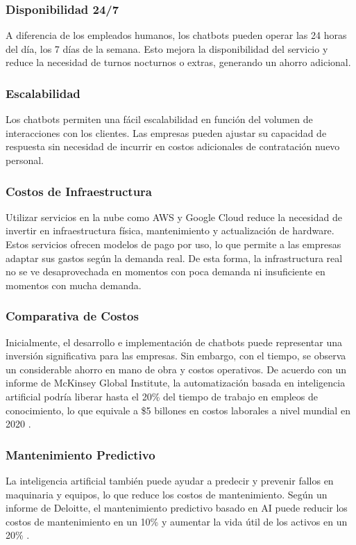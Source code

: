 \subsubsection{Disponibilidad 24/7}
A diferencia de los empleados humanos, los chatbots pueden operar las 24 horas del día, los 7 días de la semana. Esto mejora la disponibilidad del servicio y reduce la necesidad de turnos nocturnos o extras, generando un ahorro adicional.

\subsubsection{Escalabilidad}
Los chatbots permiten una fácil escalabilidad en función del volumen de interacciones con los clientes. Las empresas pueden ajustar su capacidad de respuesta sin necesidad de incurrir en costos adicionales de contratación nuevo personal.

\subsubsection{Costos de Infraestructura}
Utilizar servicios en la nube como AWS y Google Cloud reduce la necesidad de invertir en infraestructura física, mantenimiento y actualización de hardware. Estos servicios ofrecen modelos de pago por uso, lo que permite a las empresas adaptar sus gastos según la demanda real. De esta forma, la infrastructura real no se ve desaprovechada en momentos con poca demanda ni insuficiente en momentos con mucha demanda. 

\subsubsection{Comparativa de Costos}
Inicialmente, el desarrollo e implementación de chatbots puede representar una inversión significativa para las empresas. Sin embargo, con el tiempo, se observa un considerable ahorro en mano de obra y costos operativos. De acuerdo con un informe de McKinsey Global Institute, la automatización basada en inteligencia artificial podría liberar hasta el 20\% del tiempo de trabajo en empleos de conocimiento, lo que equivale a \$5 billones en costos laborales a nivel mundial en 2020 \cite{mckinsey2020automation}.

\subsubsection{Mantenimiento Predictivo}
La inteligencia artificial también puede ayudar a predecir y prevenir fallos en maquinaria y equipos, lo que reduce los costos de mantenimiento. Según un informe de Deloitte, el mantenimiento predictivo basado en AI puede reducir los costos de mantenimiento en un 10\% y aumentar la vida útil de los activos en un 20\% \cite{deloitte2020predictive}.

